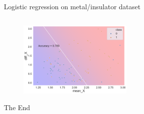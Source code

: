 \documentclass[aspectratio=169]{beamer}
\begin{document}
\begin{frame}[fragile]{Logistic regression on metal/insulator dataset}
\inputminted{python}{example_sklearn_logistic__regression.py}
\begin{figure}
    \centering
    \includegraphics[width=0.5\textwidth]{figures/logistic_metal_insulator.png}
\end{figure}
\end{frame} 

\begin{frame}
    \Huge{\centerline{The End}}
\end{frame}
\end{document}
